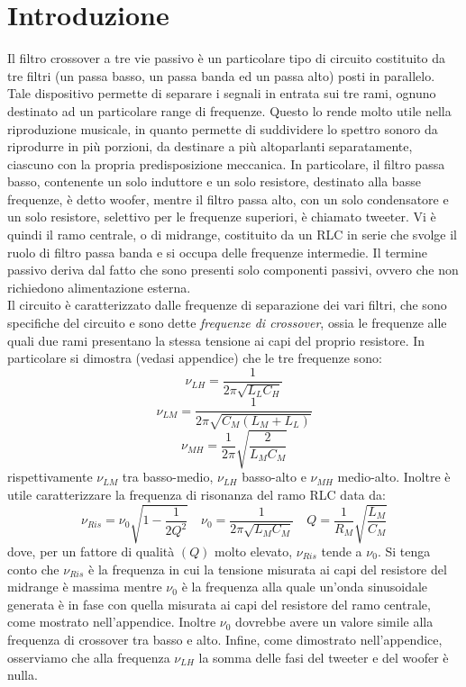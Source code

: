 \documentclass[]{article}
\begin{document}
\section{Introduzione}
\hspace{\parindent}Il filtro crossover a tre vie passivo è un particolare tipo di circuito costituito da tre filtri (un passa basso, un passa banda ed un passa alto) posti in parallelo. Tale dispositivo permette di separare i segnali in entrata sui tre rami, ognuno destinato ad un particolare range di frequenze. Questo lo rende molto utile nella riproduzione musicale, in quanto permette di suddividere lo spettro sonoro da riprodurre in più porzioni, da destinare a più altoparlanti separatamente, ciascuno con la propria predisposizione meccanica. In particolare, il filtro passa basso, contenente un solo induttore e un solo resistore, destinato alla basse frequenze, è detto woofer, mentre il filtro passa alto, con un solo condensatore e un solo resistore,  selettivo per le frequenze superiori, è chiamato tweeter. Vi è quindi il ramo centrale, o di midrange, costituito da un RLC in serie che svolge il ruolo di filtro passa banda e si occupa delle frequenze intermedie. Il termine passivo deriva dal fatto che sono presenti solo componenti passivi, ovvero che non richiedono alimentazione esterna.\\
\hspace{\parindent}Il circuito è caratterizzato dalle frequenze di separazione dei vari filtri, che sono specifiche del circuito e sono dette \textit{frequenze di crossover}, ossia le frequenze alle quali due rami presentano la stessa tensione ai capi del proprio resistore. In particolare si dimostra (vedasi appendice) che le tre frequenze sono: 
\begin{equation}\label{crossoverLH}
 \nu_{LH}=\frac{1}{2\pi\sqrt{L_{L}C_{H}}}
\end{equation}
\begin{equation}\label{crossoverLM}
\nu_{LM}=\frac{1}{2\pi\sqrt{C_{M}(L_{M}+L_{L})}}
\end{equation}
\begin{equation}\label{crossoverMH}
	\nu_{MH}=\frac{1}{2\pi}\sqrt{\frac{2}{L_{M}C_{M}}}
\end{equation}
rispettivamente  $\nu_{LM}$ tra basso-medio,  $\nu_{LH}$ basso-alto e  $\nu_{MH}$ medio-alto. Inoltre è utile caratterizzare la frequenza di risonanza del ramo RLC data da:
\begin{equation}
  \nu_{Ris}=\nu_0 \sqrt{1-\frac{1}{2Q^2}} \quad  \nu_{0}=\frac{1}{2\pi\sqrt{L_M C_M}} \quad Q=\frac{1}{R_M}\sqrt{\frac{L_M}{C_M}}
\end{equation}
dove, per un fattore di qualità $(Q)$ molto elevato, $\nu_{Ris}$ tende a $\nu_{0}$. Si tenga conto che $\nu_{Ris}$ è la frequenza in cui la tensione misurata ai capi del resistore del midrange è massima mentre $\nu_{0}$ è la frequenza alla quale un'onda sinusoidale generata è in fase con quella misurata ai capi del resistore del ramo centrale, come mostrato nell'appendice. 
Inoltre $\nu_{0}$ dovrebbe avere un valore simile alla frequenza di crossover tra basso e alto.
Infine, come dimostrato nell'appendice, osserviamo che alla frequenza $\nu_{LH}$ la somma delle fasi del tweeter e del woofer è nulla.
\end{document}
